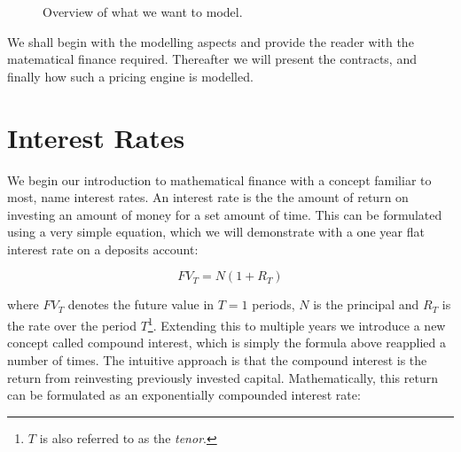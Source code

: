 \begin{figure}[h!]
\begin{center}
\begin{minipage}{\linewidth}
\caption{Overview of what we want to model.}
\label{fig:overview}
\end{minipage}
\end{center}
\end{figure}

We shall begin with the modelling aspects and provide the reader with the
matematical finance required. Thereafter we will present the contracts, and
finally how such a pricing engine is modelled. 

\section{Interest Rates}

We begin our introduction to mathematical finance with a concept familiar to
most, name interest rates. An interest rate is the the amount of return on
investing an amount of money for a set amount of time. This can be formulated
using a very simple equation, which we will demonstrate with a one year flat
interest rate on a deposits account:

\begin{equation}\label{eq:lincomp}
FV_T = N (1 + R_T)
\end{equation}

where $FV_T$ denotes the future value in $T=1$ periods, $N$ is the principal
and $R_T$ is the rate over the period $T$\footnote{$T$ is also referred to as the
\emph{tenor}.}. Extending this to multiple years we introduce a new 
concept called compound interest, which is simply the formula above reapplied
a number of times. The intuitive approach is
that the compound interest is the return from reinvesting previously invested
capital. Mathematically, this return can be formulated as an exponentially 
compounded interest rate:

